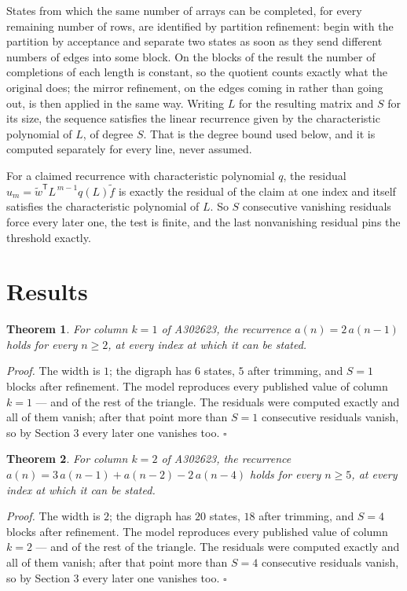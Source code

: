 \documentclass[11pt]{article}
\newtheorem{theorem}{Theorem}
\theoremstyle{definition}
\begin{document}
States from which the same number of arrays can be completed, for every remaining number of rows, are identified by partition refinement: begin with the partition by acceptance and separate two states as soon as they send different numbers of edges into some block. On the blocks of the result the number of completions of each length is constant, so the quotient counts exactly what the original does; the mirror refinement, on the edges coming in rather than going out, is then applied in the same way. Writing $L$ for the resulting matrix and $S$ for its size, the sequence satisfies the linear recurrence given by the characteristic polynomial of $L$, of degree $S$. That is the degree bound used below, and it is computed separately for every line, never assumed.

For a claimed recurrence with characteristic polynomial $q$, the residual $u_m = \tilde w^{\mathsf T}L^{\,m-1}q(L)\tilde f$ is exactly the residual of the claim at one index and itself satisfies the characteristic polynomial of $L$. So $S$ consecutive vanishing residuals force every later one, the test is finite, and the last nonvanishing residual pins the threshold exactly.

\section{Results}

\begin{theorem} For column $k = 1$ of A302623, the recurrence $a(n) = 2\,a(n-1)$ holds for every $n \ge 2$, at every index at which it can be stated.\end{theorem}

{\itshape Proof.} The width is $1$; the digraph has $6$ states, $5$ after trimming, and $S = 1$ blocks after refinement. The model reproduces every published value of column $k = 1$ --- and of the rest of the triangle. The residuals were computed exactly and all of them vanish; after that point more than $S = 1$ consecutive residuals vanish, so by Section 3 every later one vanishes too. $\square$

\begin{theorem} For column $k = 2$ of A302623, the recurrence $a(n) = 3\,a(n-1) + a(n-2) - 2\,a(n-4)$ holds for every $n \ge 5$, at every index at which it can be stated.\end{theorem}

{\itshape Proof.} The width is $2$; the digraph has $20$ states, $18$ after trimming, and $S = 4$ blocks after refinement. The model reproduces every published value of column $k = 2$ --- and of the rest of the triangle. The residuals were computed exactly and all of them vanish; after that point more than $S = 4$ consecutive residuals vanish, so by Section 3 every later one vanishes too. $\square$
\end{document}
